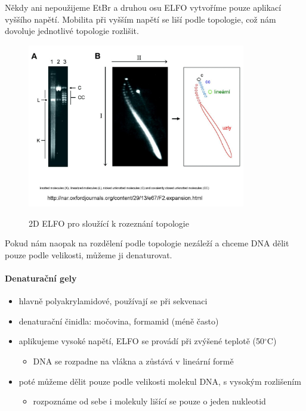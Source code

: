 \documentclass[DIV=8]{scrreprt}
\begin{document}
Někdy ani nepoužijeme EtBr a druhou osu ELFO vytvoříme pouze aplikací vyššího napětí. Mobilita při vyšším napětí se liší podle topologie, což nám dovoluje jednotlivé topologie rozlišit. \begin{figure}
    \caption{2D ELFO pro sloužící k rozeznání topologie}
    \includegraphics[width=0.85\textwidth]{slides-6/slide-27.jpg}
    \centering
    \label{}
\end{figure}


Pokud nám naopak na rozdělení podle topologie nezáleží a chceme DNA dělit pouze podle velikosti, můžeme ji denaturovat.

\paragraph{Denaturační gely}
\begin{itemize}[nosep]
    \item hlavně polyakrylamidové, používají se při sekvenaci
    \item denaturační činidla: močovina, formamid (méně často)
    \item aplikujeme vysoké napětí, ELFO se provádí při zvýšené teplotě (50\(^{\circ}\)C)
\begin{itemize}[nosep]
    \item DNA se rozpadne na vlákna a zůstává v lineární formě
\end{itemize}

    \item poté můžeme dělit pouze podle velikosti molekul DNA, s vysokým rozlišením
\begin{itemize}[nosep]
    \item rozpoznáme od sebe i molekuly lišící se pouze o jeden nukleotid
\end{itemize}

\end{itemize}
\end{document}
